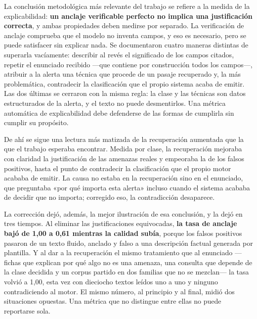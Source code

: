 La conclusión metodológica más relevante del trabajo se refiere a la medida de la explicabilidad:
\textbf{un anclaje verificable perfecto no implica una justificación correcta}, y ambas propiedades
deben medirse por separado. La verificación de anclaje comprueba que el modelo no inventa campos, y
eso es necesario, pero se puede satisfacer sin explicar nada. Se documentaron cuatro maneras
distintas de superarla vacíamente: describir al revés el significado de los campos citados, repetir
el enunciado recibido ---que contiene por construcción todos los campos---, atribuir a la alerta
una técnica que procede de un pasaje recuperado y, la más problemática, contradecir la
clasificación que el propio sistema acaba de emitir. Las dos últimas se cerraron con la misma
regla: la clase y las técnicas son datos estructurados de la alerta, y el texto no puede
desmentirlos. Una métrica
automática de explicabilidad debe defenderse de las formas de cumplirla sin cumplir su propósito.

De ahí se sigue una lectura más matizada de la recuperación aumentada que la que el trabajo
esperaba encontrar. Medida por clase, la recuperación mejoraba con claridad la justificación de las
amenazas reales y empeoraba la de los falsos positivos, hasta el punto de contradecir la
clasificación que el propio motor acababa de emitir. La causa no estaba en la recuperación sino en
el enunciado, que preguntaba «por qué importa esta alerta» incluso cuando el sistema acababa de
decidir que no importa; corregido eso, la contradicción desaparece.

La corrección dejó, además, la mejor ilustración de esa conclusión, y la dejó en tres tiempos.
Al eliminar las justificaciones equivocadas, \textbf{la tasa de anclaje bajó de 1,00 a 0,61
mientras la calidad subía}, porque los falsos positivos pasaron de un texto fluido, anclado y
falso a una descripción factual generada por plantilla. Y al dar a la recuperación el mismo
tratamiento que al enunciado ---fichas que explican por qué algo no es una amenaza, una consulta
que depende de la clase decidida y un corpus partido en dos familias que no se mezclan--- la tasa
volvió a 1,00, esta vez con dieciocho textos leídos uno a uno y ninguno contradiciendo al motor.
El mismo número, al principio y al final, midió dos situaciones opuestas. Una métrica que no
distingue entre ellas no puede reportarse sola.

